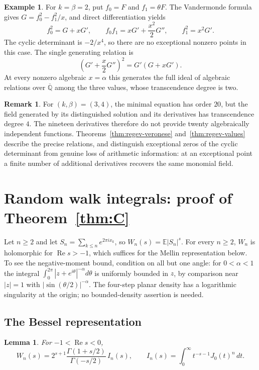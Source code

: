 \documentclass[11pt]{amsart}
\newtheorem{lemma}[thm]{Lemma}
\theoremstyle{definition}
\newtheorem{remark}[thm]{Remark}
\newtheorem{example}[thm]{Example}
\newcommand{\Q}{\mathbb Q}
\begin{document}
\begin{example}
For $k=\beta=2$, put $f_0=F$ and $f_1=\theta F$.  The
Vandermonde formula gives $G=f_0^2-f_1^2/x$, and direct
differentiation yields
\[
 f_0^2=G+xG',\qquad
 f_0f_1=xG'+\frac{x^2}{2}G'',\qquad
 f_1^2=x^2G'.
\]
The cyclic determinant is $-2/x^4$, so there are no exceptional
nonzero points in this case.  The single generating relation is
\[
 \left(G'+\frac x2G''\right)^2=G'(G+xG').
\]
At every nonzero algebraic $x=\alpha$ this generates the full ideal
of algebraic relations over $\overline{\Q}$ among the three
values, whose transcendence degree is two.
\end{example}

\begin{remark}
For $(k,\beta)=(3,4)$, the minimal equation has order $20$, but the
field generated by its distinguished solution and its derivatives
has transcendence degree $4$.  The nineteen derivatives therefore
do not provide twenty algebraically independent functions.
Theorems~\ref{thm:regev-veronese} and~\ref{thm:regev-values}
describe the precise relations, and distinguish exceptional zeros
of the cyclic determinant from genuine loss of arithmetic
information: at an exceptional point a finite number of additional
derivatives recovers the same monomial field.
\end{remark}

\section{Random walk integrals: proof of \texorpdfstring{Theorem~\ref{thm:C}}{Theorem C}}\label{sec:C}

Let $n\ge2$ and let $S_n=\sum_{k\le n}e^{2\pi ix_k}$, so $W_n(s)=\mathbb E|S_n|^s$. For every $n\ge2$, $W_n$ is holomorphic for
$\operatorname{Re}s>-1$, which suffices for the Mellin representation
below.  To see the negative-moment bound, condition on all but one angle:
for $0<\alpha<1$ the integral
$\int_0^{2\pi}|z+e^{i\theta}|^{-\alpha}d\theta$ is uniformly bounded in
$z$, by comparison near $|z|=1$ with
$|\sin(\theta/2)|^{-\alpha}$.  The four-step planar density has a
logarithmic singularity at the origin; no bounded-density assertion is
needed.

\subsection{The Bessel representation}

\begin{lemma}\label{lem:mellin}
For $-1<\operatorname{Re}s<0$,
\begin{equation}\label{eq:mellin}
W_n(s)=2^{s+1}\frac{\Gamma(1+s/2)}{\Gamma(-s/2)}\,I_n(s),\qquad I_n(s)=\int_0^\infty t^{-s-1}J_0(t)^n\,dt .
\end{equation}
\end{lemma}
\end{document}
